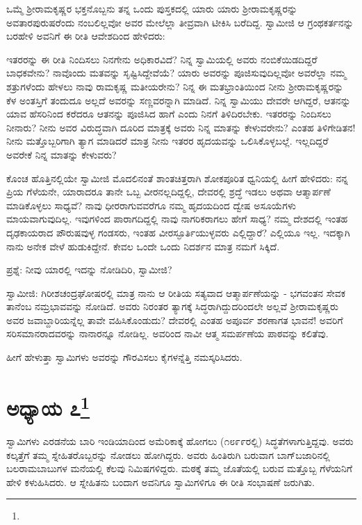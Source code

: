 ಒಮ್ಮೆ ಶ‍್ರೀರಾಮಕೃಷ್ಣರ ಭಕ್ತನೊಬ್ಬನು ತನ್ನ ಒಂದು ಪುಸ್ತಕದಲ್ಲಿ ಯಾರು ಯಾರು ಶ‍್ರೀರಾಮಕೃಷ್ಣರನ್ನು ಅವತಾರಪುರುಷರೆಂದು ನಂಬಲಿಲ್ಲವೋ ಅವರ ಮೇಲೆಲ್ಲಾ ತೀವ್ರವಾಗಿ ಟೀಕಿಸಿ ಬರೆದಿದ್ದ. ಸ್ವಾಮೀಜಿ ಆ ಗ್ರಂಥಕರ್ತನನ್ನು ಬರಹೇಳಿ ಅವನಿಗೆ ಈ ರೀತಿ ಆವೇಶದಿಂದ ಹೇಳಿದರು:

ಇತರರನ್ನು ಈ ರೀತಿ ನಿಂದಿಸಲು ನಿನಗೇನು ಅಧಿಕಾರವಿದೆ? ನಿನ್ನ ಸ್ವಾಮಿಯಲ್ಲಿ ಅವರು ನಂಬಿಕೆಯಿಡದಿದ್ದರೆ ಬಾಧಕವೇನು? ನಾವೊಂದು ಮತವನ್ನು ಸೃಷ್ಟಿಸಿದ್ದೇವೆಯೆ? ಯಾರು ಅವರನ್ನು ಪೂಜಿಸುವುದಿಲ್ಲವೋ ಅವರೆಲ್ಲಾ ನಮ್ಮ ಶತ್ರುಗಳೆಂದು ಹೇಳಲು ನಾವು ರಾಮಕೃಷ್ಣ ಮತೀಯರೇನು? ನಿನ್ನ ಈ ಮತಭ್ರಾಂತಿಯಿಂದ ನೀನು ಶ‍್ರೀರಾಮಕೃಷ್ಣರನ್ನು ಕೆಳ ಅಂತಸ್ತಿಗೆ ತಂದುದೂ ಅಲ್ಲದೆ ಅವರನ್ನು ಸಣ್ಣವರನ್ನಾಗಿ ಮಾಡಿದೆ. ನಿನ್ನ ಸ್ವಾಮಿಯು ದೇವರೇ ಆಗಿದ್ದರೆ, ಆತನನ್ನು ಯಾವ ಹೆಸರಿನಿಂದ ಕರೆದರೂ ಆತನನ್ನು ಪೂಜಿಸಿದ ಹಾಗೆ ಎಂದು ನಿನಗೆ ತಿಳಿದಿರಬೇಕು. ಇತರರನ್ನು ನಿಂದಿಸಲು ನೀನಾರು? ನೀನು ಅವರ ವಿರುದ್ಧವಾಗಿ ದೂರಿದ ಮಾತ್ರಕ್ಕೆ ಅವರು ನಿನ್ನ ಮಾತನ್ನು ಕೇಳುವರೇನು? ಎಂತಹ ತಿಳಿಗೇಡಿತನ! ನೀನು ಮತ್ತೊಬ್ಬರಿಗಾಗಿ ತ್ಯಾಗ ಮಾಡಿದರೆ ಮಾತ್ರ ನೀನು ಇತರರ ಹೃದಯವನ್ನು ಒಲಿಸಿಕೊಳ್ಳಬಲ್ಲೆ. ಇಲ್ಲದಿದ್ದರೆ ಅವರೇಕೆ ನಿನ್ನ ಮಾತನ್ನು ಕೇಳುವರು?

ಕೊಂಚ ಹೊತ್ತಿನಲ್ಲಿಯೇ ಸ್ವಾಮೀಜಿ ಮೊದಲಿನಂತೆ ಶಾಂತಚಿತ್ತರಾಗಿ ಶೋಕಪೂರಿತ ಧ್ವನಿಯಲ್ಲಿ ಹೀಗೆ ಹೇಳಿದರು: ನನ್ನ ಪ್ರಿಯ ಗೆಳೆಯನೇ, ಯಾರಾದರೂ ತಾನೇ ಒಬ್ಬ ವೀರನಲ್ಲದಿದ್ದಲ್ಲಿ, ದೇವರಲ್ಲಿ ಶ್ರದ್ಧೆ ಇಡಲು ಅಥವಾ ಆತ್ಮಾರ್ಪಣೆ ಮಾಡಿಕೊಳ್ಳಲು ಸಾಧ್ಯವೆ? ನಾವು ಧೀರರಾಗುವವರೆಗೂ ನಮ್ಮ ಹೃದಯದಿಂದ ದ್ವೇಷ ಅಸೂಯೆಗಳು ಮಾಯವಾಗುವುದಿಲ್ಲ. ಇವುಗಳಿಂದ ಪಾರಾಗದಿದ್ದಲ್ಲಿ ನಾವು ನಾಗರಿಕರಾಗಲು ಹೇಗೆ ಸಾಧ್ಯ? ನಮ್ಮ ದೇಶದಲ್ಲಿ ಇಂತಹ ದೃಢಕಾಯರಾದ ಪೌರುಷವುಳ್ಳ ಗಂಡಸರು, ಇಂತಹ ವೀರಸ್ಫೂರ್ತಿಯುಳ್ಳವರು ಎಲ್ಲಿದ್ದಾರೆ? ಎಲ್ಲಿಯೂ ಇಲ್ಲ. ಇದಕ್ಕಾಗಿ ನಾನು ಅನೇಕ ವೇಳೆ ಹುಡುಕಿದ್ದೇನೆ. ಕೇವಲ ಒಂದೇ ಒಂದು ನಿದರ್ಶನ ಮಾತ್ರ ನಮಗೆ ಸಿಕ್ಕಿದೆ.

ಪ್ರಶ್ನೆ: ನೀವು ಯಾರಲ್ಲಿ ಇದನ್ನು ನೋಡಿದಿರಿ, ಸ್ವಾಮೀಜಿ?

ಸ್ವಾಮೀಜಿ: ಗಿರೀಶಚಂದ್ರಘೋಷರಲ್ಲಿ ಮಾತ್ರ ನಾನು ಆ ರೀತಿಯ ಸತ್ಯವಾದ ಆತ್ಮಾರ್ಪಣೆಯನ್ನು - ಭಗವಂತನ ಸೇವಕ ತಾನೆಂಬ ನಮ್ರಭಾವವನ್ನು ನೋಡಿದೆ. ಅವರು ನಿರಂತರ ತ್ಯಾಗಕ್ಕೆ ಸಿದ್ಧರಾಗಿದ್ದುದರಿಂದಲೇ ಅಲ್ಲವೆ ಶ‍್ರೀರಾಮಕೃಷ್ಣರು ಅವರ ಜವಾಬ್ದಾರಿಯನ್ನೆಲ್ಲ ತಾವೇ ವಹಿಸಿಕೊಂಡುದು? ದೇವರಲ್ಲಿ ಎಂತಹ ಅಪೂರ್ವ ಶರಣಾಗತ ಭಾವನೆ! ಅವರಿಗೆ ಸರಿಸಮಾನರಾದವರನ್ನು ನಾನಾರನ್ನೂ ನೋಡಿಲ್ಲ. ಅವರಿಂದ ನಾವೀ ಆತ್ಮ ಸಮರ್ಪಣೆಯ ಪಾಠವನ್ನು ಕಲಿತೆವು.

ಹೀಗೆ ಹೇಳುತ್ತಾ ಸ್ವಾಮಿಗಳು ಅವರನ್ನು ಗೌರವಿಸಲು ಕೈಗಳನ್ನೆತ್ತಿ ನಮಸ್ಕರಿಸಿದರು.

\newpage

\chapter[ಅಧ್ಯಾಯ ೭]{ಅಧ್ಯಾಯ ೭\protect\footnote{}}

ಸ್ವಾಮಿಗಳು ಎರಡನೆಯ ಬಾರಿ ಇಂಡಿಯಾದಿಂದ ಅಮೆರಿಕಾಕ್ಕೆ ಹೋಗಲು (೧೮೯೯ರಲ್ಲಿ) ಸಿದ್ಧತೆಗಳಾಗುತ್ತಿದ್ದವು. ಅವರು ಕಲ್ಕತ್ತೆಗೆ ತಮ್ಮ ಸ್ನೇಹಿತರೊಬ್ಬರನ್ನು ನೋಡಲು ಹೋಗಿದ್ದರು. ಅವರು ಹಿಂತಿರುಗಿ ಬರುವಾಗ ಬಾಗ್‌ಬಜಾರಿನಲ್ಲಿ ಬಲರಾಮಬಾಬುಗಳ ಮನೆಯಲ್ಲಿ ಕೆಲವು ನಿಮಿಷಗಳಿದ್ದರು. ಮಠಕ್ಕೆ ತಮ್ಮ ಜೊತೆಯಲ್ಲಿ ಬರುವ ಮತ್ತೊಬ್ಬ ಗೆಳೆಯನಿಗೆ ಹೇಳಿ ಕಳುಹಿಸಿದರು. ಆ ಸ್ನೇಹಿತನು ಬಂದಾಗ ಅವನಿಗೂ ಸ್ವಾಮಿಗಳಿಗೂ ಈ ರೀತಿ ಸಂಭಾಷಣೆ ಜರುಗಿತು.

